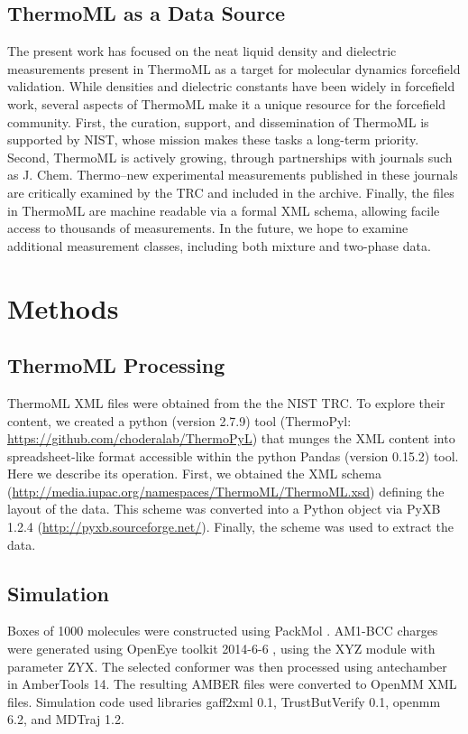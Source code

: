 \documentclass[journal=jacsat,manuscript=article]{achemso}
\begin{document}
\subsection{ThermoML as a Data Source}

The present work has focused on the neat liquid density and dielectric measurements present in ThermoML \cite{frenkel2006xml, frenkel2003thermoml, chirico2003thermoml} as a target for molecular dynamics forcefield validation.  While densities and dielectric constants have been widely in forcefield work, several aspects of ThermoML make it a unique resource for the forcefield community.  First, the curation, support, and dissemination of ThermoML is supported by NIST, whose mission makes these tasks a long-term priority.  Second, ThermoML is actively growing, through partnerships with journals such as J. Chem. Thermo--new experimental measurements published in these journals are critically examined by the TRC and included in the archive.  Finally, the files in ThermoML are machine readable via a formal XML schema, allowing facile access to thousands of measurements.  In the future, we hope to examine additional measurement classes, including both mixture and two-phase data.


\section{Methods}

\subsection{ThermoML Processing}

ThermoML XML files were obtained from the the NIST TRC.  To explore their content, we created a python (version 2.7.9) tool (ThermoPyl: \url{https://github.com/choderalab/ThermoPyL}) that munges the XML content into spreadsheet-like format accessible within the python Pandas (version 0.15.2) tool.  Here we describe its operation.  First, we obtained the XML schema (\url{http://media.iupac.org/namespaces/ThermoML/ThermoML.xsd}) defining the layout of the data.  This scheme was converted into a Python object via PyXB 1.2.4 (\url{http://pyxb.sourceforge.net/}).  Finally, the scheme was used to extract the data.  

\subsection{Simulation}
Boxes of 1000 molecules were constructed using PackMol \cite{martinez2009packmol}.  AM1-BCC charges were generated using OpenEye toolkit 2014-6-6 \cite{openeye}, using the XYZ module with parameter ZYX.  The selected conformer was then processed using antechamber in AmberTools 14.  The resulting AMBER files were converted to OpenMM \cite{eastman2012openmm} XML files.  Simulation code used libraries gaff2xml 0.1, TrustButVerify 0.1, openmm 6.2, and MDTraj \cite{mcgibbon2014mdtraj} 1.2.  
\end{document}
